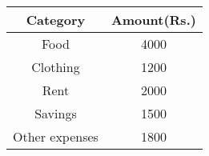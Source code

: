\begin{center}
    \begin{tabular}{|c|c|} 
        \hline
            \textbf{Category} & \textbf{Amount(Rs.)} \\
        \hline
            Food & 4000 \\
        \hline
            Clothing & 1200 \\
        \hline
            Rent & 2000 \\
        \hline
            Savings & 1500 \\
        \hline
	    Other expenses & 1800 \\
	\hline
    \end{tabular}
\end{center}  

